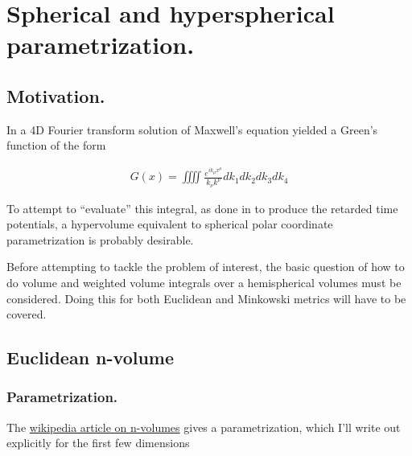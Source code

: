 \chapter{Spherical and hyperspherical parametrization.}

\section{Motivation.}

In \cite{PJ4dFourier} a 4D Fourier transform solution 
of Maxwell's equation yielded a Green's function of the form

\begin{align*}
G(x) = \iiiint \frac{e^{i k_\mu x^\mu}}{k_\nu k^\nu} dk_1 dk_2 dk_3 dk_4
\end{align*}

To attempt to ``evaluate'' this integral, as done in
\cite{PJpoisson}
to produce the retarded time potentials,
a hypervolume equivalent to spherical polar coordinate
parametrization is probably desirable.

Before attempting to tackle the problem of interest, the basic question
of how to do volume and weighted volume integrals over a hemispherical volumes
must be considered.  Doing this for both Euclidean and Minkowski metrics will have to be covered.

\section{Euclidean n-volume }

\subsection{Parametrization. }

The \href{http://en.wikipedia.org/wiki/Hypersphere}{wikipedia article on n-volumes} gives a parametrization, which I'll write out explicitly for the first few dimensions

